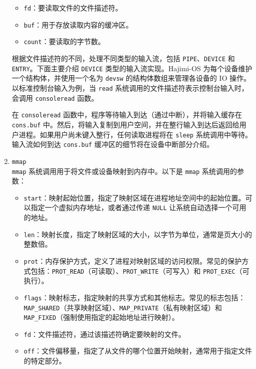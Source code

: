 \documentclass[UTF8]{article}
\begin{document}
\begin{enumerate}
        \begin{itemize}
          \item \texttt{fd}：要读取文件的文件描述符。
          \item \texttt{buf}：用于存放读取内容的缓冲区。
          \item \texttt{count}：要读取的字节数。
        \end{itemize}

        根据文件描述符的不同，处理不同类型的输入流，包括 \texttt{PIPE}、\texttt{DEVICE} 和 \texttt{ENTRY}。下面主要介绍 \texttt{DEVICE} 类型的输入流实现。Hajimi-OS 为每个设备维护一个结构体，并使用一个名为 \texttt{devsw} 的结构体数组来管理各设备的 IO 操作。以标准控制台输入为例，当 \texttt{read} 系统调用的文件描述符表示控制台输入时，会调用 \texttt{consoleread} 函数。

        在 \texttt{consoleread} 函数中，程序等待输入到达（通过中断），并将输入缓存在 \texttt{cons.buf} 中。然后，将输入复制到用户空间，并在整行输入到达后返回给用户进程。如果用户尚未键入整行，任何读取进程将在 \texttt{sleep} 系统调用中等待。输入流如何到达 \texttt{cons.buf} 缓冲区的细节将在设备中断部分介绍。

  \item \texttt{mmap\\} \texttt{mmap} 系统调用用于将文件或设备映射到内存中。以下是 \texttt{mmap} 系统调用的参数：

        \begin{itemize}
          \item \texttt{start}：映射起始位置，指定了映射区域在进程地址空间中的起始位置。可以指定一个虚拟内存地址，或者通过传递 \texttt{NULL} 让系统自动选择一个可用的地址。
          \item \texttt{len}：映射长度，指定了映射区域的大小，以字节为单位，通常是页大小的整数倍。
          \item \texttt{prot}：内存保护方式，定义了进程对映射区域的访问权限。常见的保护方式包括：\texttt{PROT\_READ}（可读取）、\texttt{PROT\_WRITE}（可写入）和 \texttt{PROT\_EXEC}（可执行）。
          \item \texttt{flags}：映射标志，指定映射的共享方式和其他标志。常见的标志包括：\texttt{MAP\_SHARED}（共享映射区域）、\texttt{MAP\_PRIVATE}（私有映射区域）和 \texttt{MAP\_FIXED}（强制使用指定的起始地址进行映射）。
          \item \texttt{fd}：文件描述符，通过该描述符确定要映射的文件。
          \item \texttt{off}：文件偏移量，指定了从文件的哪个位置开始映射，通常用于指定文件的特定部分。
        \end{itemize}


\end{enumerate}
\end{document}
